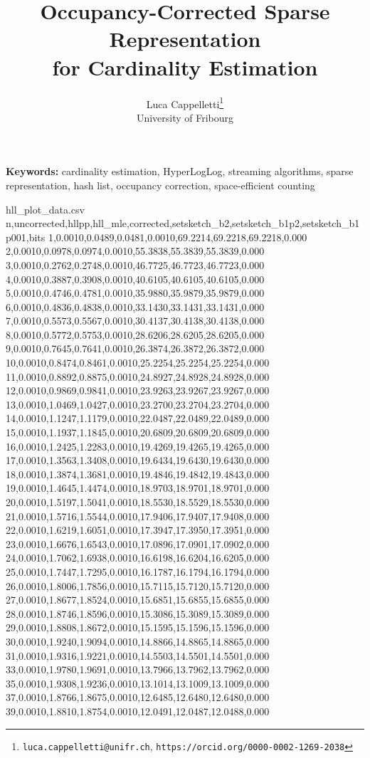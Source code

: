 \documentclass[11pt,letterpaper]{article}
\title{Occupancy-Corrected Sparse Representation\\ for Cardinality Estimation}
\author{Luca Cappelletti\thanks{\texttt{luca.cappelletti@unifr.ch}, \texttt{https://orcid.org/0000-0002-1269-2038}}\\
  University of Fribourg}
\newcommand{\keywords}[1]{\textbf{Keywords:} #1}
\begin{document}
\maketitle
\keywords{cardinality estimation, HyperLogLog, streaming algorithms, sparse representation, hash list, occupancy correction, space-efficient counting}

\begin{filecontents*}{hll_plot_data.csv}
n,uncorrected,hllpp,hll_mle,corrected,setsketch_b2,setsketch_b1p2,setsketch_b1p001,bits
1,0.0010,0.0489,0.0481,0.0010,69.2214,69.2218,69.2218,0.000
2,0.0010,0.0978,0.0974,0.0010,55.3838,55.3839,55.3839,0.000
3,0.0010,0.2762,0.2748,0.0010,46.7725,46.7723,46.7723,0.000
4,0.0010,0.3887,0.3908,0.0010,40.6105,40.6105,40.6105,0.000
5,0.0010,0.4746,0.4781,0.0010,35.9880,35.9879,35.9879,0.000
6,0.0010,0.4836,0.4838,0.0010,33.1430,33.1431,33.1431,0.000
7,0.0010,0.5573,0.5567,0.0010,30.4137,30.4138,30.4138,0.000
8,0.0010,0.5772,0.5753,0.0010,28.6206,28.6205,28.6205,0.000
9,0.0010,0.7645,0.7641,0.0010,26.3874,26.3872,26.3872,0.000
10,0.0010,0.8474,0.8461,0.0010,25.2254,25.2254,25.2254,0.000
11,0.0010,0.8892,0.8875,0.0010,24.8927,24.8928,24.8928,0.000
12,0.0010,0.9869,0.9841,0.0010,23.9263,23.9267,23.9267,0.000
13,0.0010,1.0469,1.0427,0.0010,23.2700,23.2704,23.2704,0.000
14,0.0010,1.1247,1.1179,0.0010,22.0487,22.0489,22.0489,0.000
15,0.0010,1.1937,1.1845,0.0010,20.6809,20.6809,20.6809,0.000
16,0.0010,1.2425,1.2283,0.0010,19.4269,19.4265,19.4265,0.000
17,0.0010,1.3563,1.3408,0.0010,19.6434,19.6430,19.6430,0.000
18,0.0010,1.3874,1.3681,0.0010,19.4846,19.4842,19.4843,0.000
19,0.0010,1.4645,1.4474,0.0010,18.9703,18.9701,18.9701,0.000
20,0.0010,1.5197,1.5041,0.0010,18.5530,18.5529,18.5530,0.000
21,0.0010,1.5716,1.5544,0.0010,17.9406,17.9407,17.9408,0.000
22,0.0010,1.6219,1.6051,0.0010,17.3947,17.3950,17.3951,0.000
23,0.0010,1.6676,1.6543,0.0010,17.0896,17.0901,17.0902,0.000
24,0.0010,1.7062,1.6938,0.0010,16.6198,16.6204,16.6205,0.000
25,0.0010,1.7447,1.7295,0.0010,16.1787,16.1794,16.1794,0.000
26,0.0010,1.8006,1.7856,0.0010,15.7115,15.7120,15.7120,0.000
27,0.0010,1.8677,1.8524,0.0010,15.6851,15.6855,15.6855,0.000
28,0.0010,1.8746,1.8596,0.0010,15.3086,15.3089,15.3089,0.000
29,0.0010,1.8808,1.8672,0.0010,15.1595,15.1596,15.1596,0.000
30,0.0010,1.9240,1.9094,0.0010,14.8866,14.8865,14.8865,0.000
31,0.0010,1.9316,1.9221,0.0010,14.5503,14.5501,14.5501,0.000
33,0.0010,1.9780,1.9691,0.0010,13.7966,13.7962,13.7962,0.000
35,0.0010,1.9308,1.9236,0.0010,13.1014,13.1009,13.1009,0.000
37,0.0010,1.8766,1.8675,0.0010,12.6485,12.6480,12.6480,0.000
39,0.0010,1.8810,1.8754,0.0010,12.0491,12.0487,12.0488,0.000

\end{filecontents*}
\end{document}
